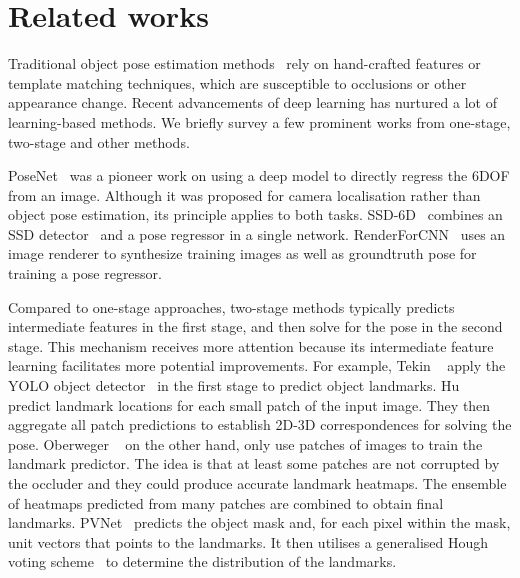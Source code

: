 \documentclass[10pt,twocolumn,letterpaper]{article}
\begin{document}
\section{Related works}

Traditional object pose estimation methods~\cite{gu2010discriminative, hinterstoisser2011gradient, huttenlocher1993comparing, Hinterstoisser2012model, lepetit2005monocular, lowe1999object} rely on hand-crafted features or template matching techniques, which are susceptible to occlusions or other appearance change. Recent advancements of deep learning has nurtured a lot of learning-based methods. We briefly survey a few prominent works from one-stage, two-stage and other methods. 

PoseNet~\cite{kendall2015posenet} was a pioneer work on using a deep model to directly regress the 6DOF from an image. Although it was proposed for camera localisation rather than object pose estimation, its principle applies to both tasks. SSD-6D~\cite{Kehl2017ssd} combines an SSD detector~\cite{Liu2016ssd} and a pose regressor in a single network. RenderForCNN~\cite{su2015render} uses an image renderer to synthesize training images as well as groundtruth pose for training a pose regressor. 

Compared to one-stage approaches, two-stage methods typically predicts intermediate features in the first stage, and then solve for the pose in the second stage. This mechanism receives more attention because its intermediate feature learning facilitates more potential improvements. For example, Tekin \etal~\cite{tekin2018real} apply the YOLO object detector~\cite{redmon2017yolo9000} in the first stage to predict object landmarks. 
Hu \etal~\cite{Hu2019segmentation} predict landmark locations for each small patch of the input image. They then aggregate all patch predictions to establish 2D-3D correspondences for solving the pose. Oberweger \etal~\cite{Oberweger2018making} on the other hand, only use patches of images to train the landmark predictor. The idea is that at least some patches are not corrupted by the occluder and they could produce accurate landmark heatmaps. The ensemble of heatmaps predicted from many patches are combined to obtain final landmarks. PVNet~\cite{Peng2019pvnet} predicts the object mask and, for each pixel within the mask, unit vectors that points to the landmarks. It then utilises a generalised Hough voting scheme~\cite{ballard1981generalizing} to determine the distribution of the landmarks. 
\end{document}
